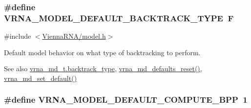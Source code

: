 \subsubsection[{\texorpdfstring{V\+R\+N\+A\+\_\+\+M\+O\+D\+E\+L\+\_\+\+D\+E\+F\+A\+U\+L\+T\+\_\+\+B\+A\+C\+K\+T\+R\+A\+C\+K\+\_\+\+T\+Y\+PE}{VRNA_MODEL_DEFAULT_BACKTRACK_TYPE}}]{\setlength{\rightskip}{0pt plus 5cm}\#define V\+R\+N\+A\+\_\+\+M\+O\+D\+E\+L\+\_\+\+D\+E\+F\+A\+U\+L\+T\+\_\+\+B\+A\+C\+K\+T\+R\+A\+C\+K\+\_\+\+T\+Y\+PE~\textquotesingle{}F\textquotesingle{}}\hypertarget{group__model__details_gad0e81fcaca53c4a826c68e0796de2afb}{}\label{group__model__details_gad0e81fcaca53c4a826c68e0796de2afb}


{\ttfamily \#include $<$\hyperlink{model_8h}{Vienna\+R\+N\+A/model.\+h}$>$}



Default model behavior on what type of backtracking to perform. 

\begin{DoxySeeAlso}{See also}
\hyperlink{group__model__details_abb265da25121d22ed11c8435861f0e53}{vrna\+\_\+md\+\_\+t.\+backtrack\+\_\+type}, \hyperlink{group__model__details_ga70834424cf804d149937de89f80ceb45}{vrna\+\_\+md\+\_\+defaults\+\_\+reset()}, \hyperlink{group__model__details_ga8ac6ff84936282436f822644bf841f66}{vrna\+\_\+md\+\_\+set\+\_\+default()} 
\end{DoxySeeAlso}
\subsubsection[{\texorpdfstring{V\+R\+N\+A\+\_\+\+M\+O\+D\+E\+L\+\_\+\+D\+E\+F\+A\+U\+L\+T\+\_\+\+C\+O\+M\+P\+U\+T\+E\+\_\+\+B\+PP}{VRNA_MODEL_DEFAULT_COMPUTE_BPP}}]{\setlength{\rightskip}{0pt plus 5cm}\#define V\+R\+N\+A\+\_\+\+M\+O\+D\+E\+L\+\_\+\+D\+E\+F\+A\+U\+L\+T\+\_\+\+C\+O\+M\+P\+U\+T\+E\+\_\+\+B\+PP~1}\hypertarget{group__model__details_ga1d6cd5051940b126c248147c011bac6c}{}\label{group__model__details_ga1d6cd5051940b126c248147c011bac6c}



